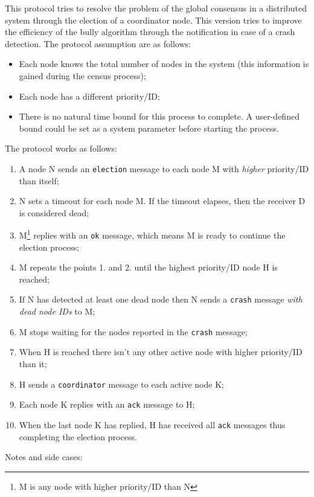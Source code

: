 This protocol tries to resolve the problem of the global consensus in a distributed system through the election
of a coordinator node. This version tries to improve the efficiency of the bully algorithm through the notification in case of a crash detection. The protocol assumption are as follows:
\begin{itemize}
\item Each node knows the total number of nodes in the system (this
  information is gained during the census process);
\item Each node has a different priority/ID;
\item There is no natural time bound for this process to complete. A
  user-defined bound could be set as a system parameter before starting the
  process.
\end{itemize}
The protocol works as follows:
\begin{enumerate}
\item A node N sends an \texttt{election} message to each node M with
  \textit{higher} priority/ID than itself;
\item N sets a timeout for each node M. If the timeout elapses, then the
  receiver D is considered dead; %
\item M\footnote{M is any node with higher priority/ID than N} replies with an
  \texttt{ok} message, which means M is ready to continue the election process;
\item M repeats the points 1. and 2. until the highest priority/ID node H is
  reached;
\item If N has detected at least one dead node then N sends a \texttt{crash}
  message \textit{with dead node IDs} to M;
\item M stops waiting for the nodes reported in the \texttt{crash} message;
\item When H is reached there isn't any other active node with higher
  priority/ID than it;
\item H sends a \texttt{coordinator} message to each active node K;
\item Each node K replies with an \texttt{ack} message to H;
\item When the last node K has replied, H has received all \texttt{ack}
  messages thus completing the election process.
\end{enumerate}
Notes and side cases:
